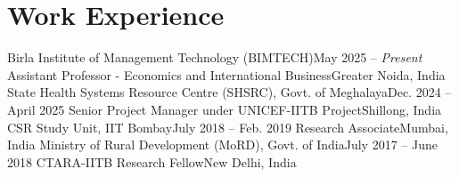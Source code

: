 \section{Work Experience}
  \CVSubHeadingListStart

  \CVSubheading
    {Birla Institute of Management Technology (BIMTECH)}{May 2025 -- \textit{Present}}
    {Assistant Professor - Economics and International Business}{Greater Noida, India}
  \CVSubheading
    {State Health Systems Resource Centre (SHSRC), Govt. of Meghalaya}{Dec. 2024 -- April 2025}
    {Senior Project Manager under UNICEF-IITB Project}{Shillong, India}
  \CVSubheading
    {CSR Study Unit, IIT Bombay}{July 2018 -- Feb. 2019}
    {Research Associate}{Mumbai, India}
  \CVSubheading
    {Ministry of Rural Development (MoRD), Govt. of India}{July 2017 -- June 2018}
    {CTARA-IITB Research Fellow}{New Delhi, India}
  \CVSubHeadingListEnd
